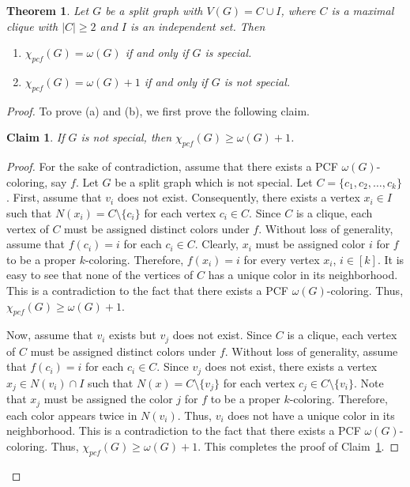 \documentclass[11pt]{article}
\theoremstyle{plain}
\newtheorem{theorem}{Theorem}
\newtheorem{claim}{Claim}
\begin{document}
\begin{theorem}\label{split}
	Let $G$ be a split graph with $V(G) = C \cup I$, where $C$ is a maximal clique with $|C|\geq 2$ and $I$ is an independent set. Then 
	\begin{enumerate}
		\item $\chi_{pcf}(G) = \omega(G)$ if and only if $G$ is special.
		\item $\chi_{pcf}(G) = \omega(G)+1$ if and only if $G$ is not special.
	\end{enumerate}
\end{theorem}
\begin{proof}
	
	To prove (a) and (b), we first prove the following claim.
	\begin{claim}\label{bound_pseudo-split}
		If $G$ is not special, then $\chi_{pcf}(G)\geq \omega(G)+1$.
	\end{claim}
	\begin{proof}
		For the sake of contradiction, assume that there exists a PCF $\omega(G)$-coloring, say $f$.
		Let $G$ be a split graph which is not special. Let $C = \{c_1, c_2, \ldots, c_k\}$. 
		First, assume that $v_i$ does not exist. 
		Consequently, there exists a vertex $x_i\in I$ such that $N(x_i) = C\setminus\{c_i\}$ for each vertex $c_i\in C$. Since $C$ is a clique, each vertex of $C$ must be assigned distinct colors under $f$. Without loss of generality, assume that $f(c_i) = i$ for each $c_i\in C$. Clearly, $x_i$ must be assigned color $i$ for $f$ to be a proper $k$-coloring. Therefore, $f(x_i) = i$ for every vertex $x_i$, $i\in [k]$.
		It is easy to see that none of the vertices of $C$ has a unique color in its neighborhood. This is a contradiction to the fact that there exists a PCF $\omega(G)$-coloring. Thus, $\chi_{pcf}(G)\geq \omega(G)+1$.
		
		\medskip
		
		Now, assume that $v_i$ exists but $v_j$ does not exist.  Since $C$ is a clique, each vertex of $C$ must be assigned distinct colors under $f$. Without loss of generality, assume that $f(c_i) = i$ for each $c_i\in C$. 
		Since $v_j$ does not exist, there exists a vertex $x_j\in N(v_i)\cap I$ such that $N(x) = C\setminus\{v_j\}$ for each vertex $c_j\in C\setminus\{v_i\}$. Note that $x_j$ must be assigned the color $j$ for $f$ to be a proper $k$-coloring. 
		Therefore, each color appears twice in $N(v_i)$. Thus, $v_i$ does not have a unique color in its neighborhood. 
		This is a contradiction to the fact that there exists a PCF $\omega(G)$-coloring. Thus, $\chi_{pcf}(G)\geq \omega(G)+1$.
		This completes the proof of Claim~\ref{bound_pseudo-split}.
	\end{proof}
	

\end{proof}
\end{document}
